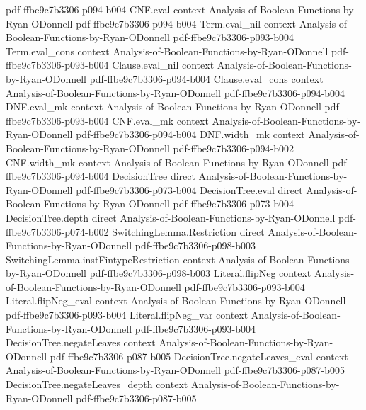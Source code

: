 \begin{lemma}
  {pdf-ffbe9c7b3306-p094-b004}
\proofstep
  {CNF.eval}
  {context}
  {Analysis-of-Boolean-Functions-by-Ryan-ODonnell}
  {pdf-ffbe9c7b3306-p094-b004}
\proofstep
  {Term.eval_nil}
  {context}
  {Analysis-of-Boolean-Functions-by-Ryan-ODonnell}
  {pdf-ffbe9c7b3306-p093-b004}
\proofstep
  {Term.eval_cons}
  {context}
  {Analysis-of-Boolean-Functions-by-Ryan-ODonnell}
  {pdf-ffbe9c7b3306-p093-b004}
\proofstep
  {Clause.eval_nil}
  {context}
  {Analysis-of-Boolean-Functions-by-Ryan-ODonnell}
  {pdf-ffbe9c7b3306-p094-b004}
\proofstep
  {Clause.eval_cons}
  {context}
  {Analysis-of-Boolean-Functions-by-Ryan-ODonnell}
  {pdf-ffbe9c7b3306-p094-b004}
\proofstep
  {DNF.eval_mk}
  {context}
  {Analysis-of-Boolean-Functions-by-Ryan-ODonnell}
  {pdf-ffbe9c7b3306-p093-b004}
\proofstep
  {CNF.eval_mk}
  {context}
  {Analysis-of-Boolean-Functions-by-Ryan-ODonnell}
  {pdf-ffbe9c7b3306-p094-b004}
\proofstep
  {DNF.width_mk}
  {context}
  {Analysis-of-Boolean-Functions-by-Ryan-ODonnell}
  {pdf-ffbe9c7b3306-p094-b002}
\proofstep
  {CNF.width_mk}
  {context}
  {Analysis-of-Boolean-Functions-by-Ryan-ODonnell}
  {pdf-ffbe9c7b3306-p094-b004}
\proofstep
  {DecisionTree}
  {direct}
  {Analysis-of-Boolean-Functions-by-Ryan-ODonnell}
  {pdf-ffbe9c7b3306-p073-b004}
\proofstep
  {DecisionTree.eval}
  {direct}
  {Analysis-of-Boolean-Functions-by-Ryan-ODonnell}
  {pdf-ffbe9c7b3306-p073-b004}
\proofstep
  {DecisionTree.depth}
  {direct}
  {Analysis-of-Boolean-Functions-by-Ryan-ODonnell}
  {pdf-ffbe9c7b3306-p074-b002}
\proofstep
  {SwitchingLemma.Restriction}
  {direct}
  {Analysis-of-Boolean-Functions-by-Ryan-ODonnell}
  {pdf-ffbe9c7b3306-p098-b003}
\proofstep
  {SwitchingLemma.instFintypeRestriction}
  {context}
  {Analysis-of-Boolean-Functions-by-Ryan-ODonnell}
  {pdf-ffbe9c7b3306-p098-b003}
\proofstep
  {Literal.flipNeg}
  {context}
  {Analysis-of-Boolean-Functions-by-Ryan-ODonnell}
  {pdf-ffbe9c7b3306-p093-b004}
\proofstep
  {Literal.flipNeg_eval}
  {context}
  {Analysis-of-Boolean-Functions-by-Ryan-ODonnell}
  {pdf-ffbe9c7b3306-p093-b004}
\proofstep
  {Literal.flipNeg_var}
  {context}
  {Analysis-of-Boolean-Functions-by-Ryan-ODonnell}
  {pdf-ffbe9c7b3306-p093-b004}
\proofstep
  {DecisionTree.negateLeaves}
  {context}
  {Analysis-of-Boolean-Functions-by-Ryan-ODonnell}
  {pdf-ffbe9c7b3306-p087-b005}
\proofstep
  {DecisionTree.negateLeaves_eval}
  {context}
  {Analysis-of-Boolean-Functions-by-Ryan-ODonnell}
  {pdf-ffbe9c7b3306-p087-b005}
\proofstep
  {DecisionTree.negateLeaves_depth}
  {context}
  {Analysis-of-Boolean-Functions-by-Ryan-ODonnell}
  {pdf-ffbe9c7b3306-p087-b005}
\proofstep

\end{lemma}

